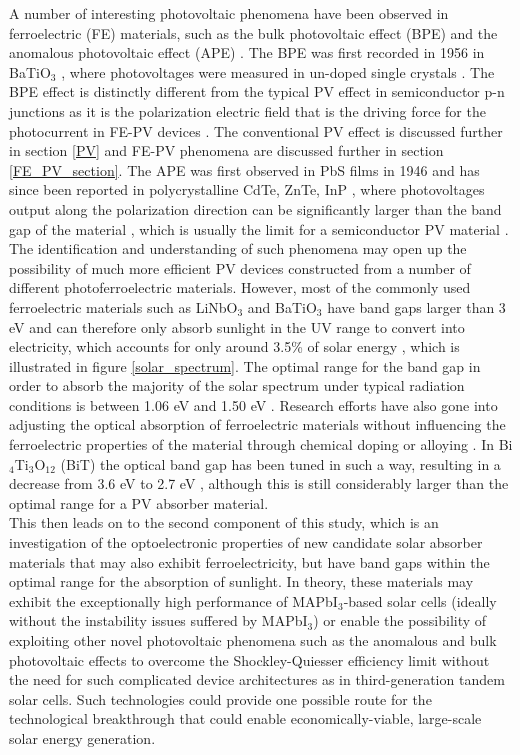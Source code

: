 A number of interesting photovoltaic phenomena have been observed in ferroelectric (FE) materials, such as the bulk photovoltaic effect (BPE) and the anomalous photovoltaic effect (APE) \cite{keith}.
The BPE was first recorded in 1956 in BaTiO$_3$ \cite{keith_46}, where photovoltages were measured in un-doped single crystals \cite{keith}.
The BPE effect is distinctly different from the typical PV effect in semiconductor
p-n junctions as it is the polarization electric field that is the driving force for the photocurrent in FE-PV devices \cite{FE_PV_rev1}. The conventional PV effect is discussed further in section \ref{PV} and FE-PV phenomena are discussed further in section \ref{FE_PV_section}.
The APE was first observed in PbS films in 1946 \cite{keith_54} and has since been reported in polycrystalline CdTe, ZnTe, InP \cite{keith_55, keith_56, keith_57}, where photovoltages output along the polarization direction can be significantly larger than the band gap of the material \cite{FE_PV_rev1}, which is usually the limit for a semiconductor PV material \cite{keith}. The identification and understanding of such phenomena may open up the possibility of much more efficient PV devices constructed from a number of different photoferroelectric materials. However, most of the commonly used ferroelectric materials such as LiNbO$_3$ and BaTiO$_3$ have band gaps larger than 3 eV and can therefore only absorb sunlight in the UV range to convert into electricity, which accounts for only around 3.5\% of solar energy \cite{FE_PV_rev1}, which is illustrated in figure \ref{solar_spectrum}. The optimal range for the band gap in order to absorb the majority of the solar spectrum under typical radiation conditions is between 1.06 eV and 1.50 eV \cite{CZTS_book}. Research efforts have also gone into adjusting the optical absorption of ferroelectric materials without influencing the ferroelectric properties of the material through chemical doping or alloying \cite{FE_PV_rev1}. In Bi$_4$Ti$_3$O$_{12}$ (BiT) the optical band gap has been tuned in such a way, resulting in a decrease from 3.6 eV to 2.7 eV \cite{FE_PV_rev1_83}, although this is still considerably larger than the optimal range for a PV absorber material.\\

This then leads on to the second component of this study, which is an investigation of the optoelectronic properties of new candidate solar absorber materials that may also exhibit ferroelectricity, but have band gaps within the optimal range for the absorption of sunlight. In theory, these materials may exhibit the exceptionally high performance of MAPbI$_3$-based solar cells (ideally without the instability issues suffered by MAPbI$_3$) or enable the possibility of exploiting other novel photovoltaic phenomena such as the anomalous and bulk photovoltaic effects to overcome the Shockley-Quiesser efficiency limit without the need for such complicated device architectures as in third-generation tandem solar cells. Such technologies could provide one possible route for the technological breakthrough that could enable economically-viable, large-scale solar energy generation.

